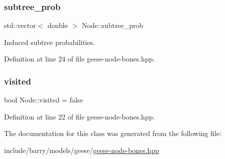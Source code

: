 \subsubsection{\texorpdfstring{subtree\+\_\+prob}{subtree\_prob}}
{\footnotesize\ttfamily std\+::vector$<$ double $>$ Node\+::subtree\+\_\+prob}



Induced subtree probabilities. 



Definition at line 24 of file geese-\/node-\/bones.\+hpp.

\mbox{\label{class_node_aa1bdec4e775fc578632e6a2dced9e251}} 
\subsubsection{\texorpdfstring{visited}{visited}}
{\footnotesize\ttfamily bool Node\+::visited = false}



Definition at line 22 of file geese-\/node-\/bones.\+hpp.



The documentation for this class was generated from the following file\+:\begin{DoxyCompactItemize}
\item 
include/barry/models/geese/\hyperlink{geese-node-bones_8hpp}{geese-\/node-\/bones.\+hpp}\end{DoxyCompactItemize}
